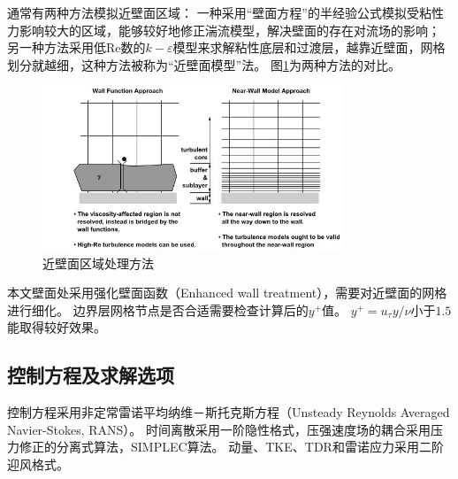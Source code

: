 通常有两种方法模拟近壁面区域：
一种采用“壁面方程”的半经验公式模拟受粘性力影响较大的区域，能够较好地修正湍流模型，解决壁面的存在对流场的影响；
另一种方法采用低$\mathrm{Re}$数的$k-\varepsilon$模型来求解粘性底层和过渡层，越靠近壁面，网格划分就越细，这种方法被称为“近壁面模型”法。
图\ref{fig:wall-treatment}为两种方法的对比\cite{fluent2015theory}。
\begin{figure}[!htbp]
  \centering
  \includegraphics[width=0.8\textwidth]{tornado-simulation/fig/wall_treatment.jpg}
  \caption{近壁面区域处理方法}
  \label{fig:wall-treatment}
\end{figure}

本文壁面处采用强化壁面函数（Enhanced wall treatment\cite{fluent2015user}），需要对近壁面的网格进行细化。
边界层网格节点是否合适需要检查计算后的$y^{+}$值。
$y^{+}=u_{\tau} y/\nu$小于$1.5$能取得较好效果。


\subsection{控制方程及求解选项}
控制方程采用非定常雷诺平均纳维－斯托克斯方程（Unsteady Reynolds Averaged Navier-Stokes, RANS）。
时间离散采用一阶隐性格式，压强速度场的耦合采用压力修正的分离式算法，SIMPLEC算法。
动量、TKE、TDR和雷诺应力采用二阶迎风格式。
